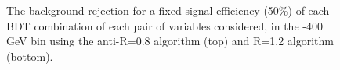 %



\begin{figure}
\begin{center}
\caption{
The background rejection
for a fixed signal efficiency (50\%) of each BDT combination of
each pair of variables considered, in the -400 GeV bin using the anti-\kT R=0.8
algorithm (top) and R=1.2 algorithm (bottom).
}
\label{fig:pt300_comb2D}
\end{center}
\end{figure}


